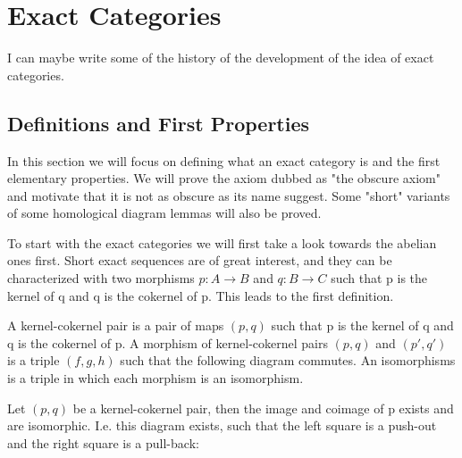 \chapter{Exact Categories}
            
I can maybe write some of the history of the development of the idea of exact categories. 

\section{Definitions and First Properties}

    In this section we will focus on defining what an exact category is and the first elementary properties. We will prove the axiom dubbed as "the obscure axiom" and motivate that it is not as obscure as its name suggest. Some "short" variants of some homological diagram lemmas will also be proved.

    To start with the exact categories we will first take a look towards the abelian ones first. Short exact sequences are of great interest, and they can be characterized with two morphisms $p:A\rightarrow B$ and $q:B\rightarrow C$ such that p is the kernel of q and q is the cokernel of p. This leads to the first definition.

    \begin{definition}
        A kernel-cokernel pair is a pair of maps $(p,q)$ such that p is the kernel of q and q is the cokernel of p. A morphism of kernel-cokernel pairs $(p,q)$ and $(p',q')$ is a triple $(f,g,h)$ such that the following diagram commutes. An isomorphisms is a triple in which each morphism is an isomorphism.
        \begin{center}
        \end{center}
    \end{definition}

    \begin{lemma}
        Let $(p,q)$ be a kernel-cokernel pair, then the image and coimage of p exists and are isomorphic. I.e. this diagram exists, such that the left square is a push-out and the right square is a pull-back:
        \begin{center}
        \end{center}
    \end{lemma}
    
